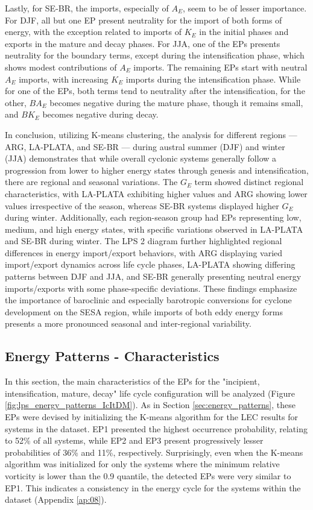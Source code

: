 Lastly, for SE-BR, the imports, especially of $A_E$, seem to be of lesser importance. For DJF, all but one EP present neutrality for the import of both forms of energy, with the exception related to imports of $K_E$ in the initial phases and exports in the mature and decay phases. For JJA, one of the EPs presents neutrality for the boundary terms, except during the intensification phase, which shows modest contributions of $A_E$ imports. The remaining EPs start with neutral $A_E$ imports, with increasing $K_E$ imports during the intensification phase. While for one of the EPs, both terms tend to neutrality after the intensification, for the other, $BA_E$ becomes negative during the mature phase, though it remains small, and $BK_E$ becomes negative during decay.

In conclusion, utilizing K-means clustering, the analysis for different regions — ARG, LA-PLATA, and SE-BR — during austral summer (DJF) and winter (JJA) demonstrates that while overall cyclonic systems generally follow a progression from lower to higher energy states through genesis and intensification, there are regional and seasonal variations. The $G_E$ term showed distinct regional characteristics, with LA-PLATA exhibiting higher values and ARG showing lower values irrespective of the season, whereas SE-BR systems displayed higher $G_E$ during winter. Additionally, each region-season group had EPs representing low, medium, and high energy states, with specific variations observed in LA-PLATA and SE-BR during winter. The LPS 2 diagram further highlighted regional differences in energy import/export behaviors, with ARG displaying varied import/export dynamics across life cycle phases, LA-PLATA showing differing patterns between DJF and JJA, and SE-BR generally presenting neutral energy imports/exports with some phase-specific deviations. These findings emphasize the importance of baroclinic and especially barotropic conversions for cyclone development on the SESA region, while imports of both eddy energy forms presents a more pronounced seasonal and inter-regional variability.

\subsection{Energy Patterns - Characteristics}\label{ch:ep_mean_features}

In this section, the main characteristics of the EPs for the "incipient, intensification, mature, decay"  life cycle configuration will be analyzed (Figure \ref{fig:lps_energy_patterns_IcItDM}). As in Section \ref{sec:energy_patterns}, these EPs were devised by initializing the K-means algorithm for the LEC results for systems in the dataset. EP1 presented the highest occurrence probability, relating to 52\% of all systems, while EP2 and EP3 present progressively lesser probabilities of 36\% and 11\%, respectively. Surprisingly, even when the K-means algorithm was initialized for only the systems where the minimum relative vorticity is lower than the 0.9 quantile, the detected EPs were very similar to EP1. This indicates a consistency in the energy cycle for the systems within the dataset (Appendix \ref{ap:08}).



